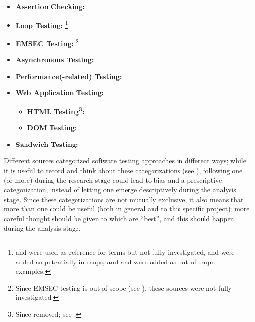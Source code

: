 \begin{itemize}
      \item \textbf{Assertion Checking:} \citet{LahiriEtAl2013, ChalinEtAl2006,
                  BerdineEtAl2006}
      \item \textbf{Loop Testing:} \citet{DhokAndRamanathan2016,
                  GodefroidAndLuchaup2011, PreußeEtAl2012,
                  ForsythEtAl2004}\footnote{\citep{ISO2015} and \citep{ISO2022}
                  were used as reference for terms but not fully
                  investigated, \citep{TrudnowskiEtAl2017} and
                  \citep{PierreEtAl2017} were added as potentially in
                  scope, and \citep{Goralski1999} and
                  \citep{Dominguez-PumarEtAl2020} were added as
                  out-of-scope examples.}
      \item \textbf{EMSEC Testing:} \citet{ZhouEtAl2012, ISO2021}\footnote{
                  Since EMSEC testing is out of scope (see
                  ), these sources were not
                  fully investigated.}
      \item \textbf{Asynchronous Testing:} \citet{JardEtAl1999}
      \item \textbf{Performance(-related) Testing:} \citet{Moghadam2019}
      \item \textbf{Web Application Testing:} \citet{DoğanEtAl2014, Kam2008}
            \begin{itemize}
                  \item \textbf{HTML Testing\footnote{Since removed; see
                                    .}:}
                        \citet{ChoudharyEtAl2010, SneedAndGöschl2000,
                              Gerrard2000b}
                  \item \textbf{DOM Testing:} \citet{BajammalAndMesbah2018}
            \end{itemize}
      \item \textbf{Sandwich Testing:} \citet{SharmaEtAl2021,
                  SangwanAndLaPlante2006}
\end{itemize}

Different sources categorized software testing approaches in different ways;
while it is useful to record and think about these categorizations (see
), following one (or more) during the research
stage could lead to bias and a prescriptive categorization, instead of letting
one emerge descriptively during the analysis stage. Since these categorizations
are not mutually exclusive, it also means that more than one could be useful
(both in general and to this specific project); more careful thought should be
given to which are ``best'', and this should happen during the analysis stage.

